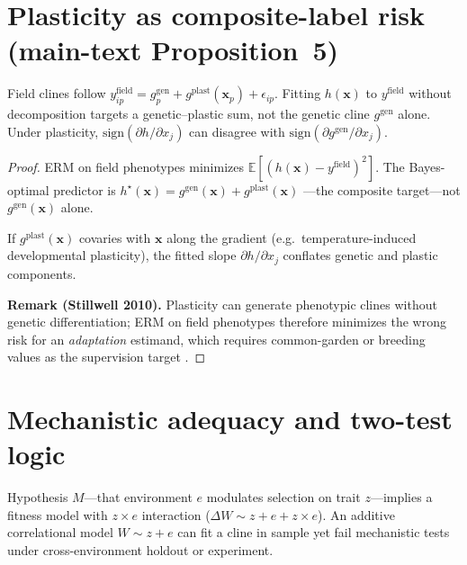\documentclass[11pt]{article}
\begin{document}
\section{Plasticity as composite-label risk (main-text Proposition~5)}
\label{sec:thm6}

\begin{theorem}
\label{thm:esm-plasticity}
Field clines follow
$y^{\mathrm{field}}_{ip}=g^{\mathrm{gen}}_p+g^{\mathrm{plast}}(\mathbf{x}_p)
+\epsilon_{ip}$.  Fitting $h(\mathbf{x})$ to $y^{\mathrm{field}}$ without
decomposition targets a genetic--plastic sum, not the genetic cline
$g^{\mathrm{gen}}$ alone.  Under plasticity,
$\mathrm{sign}(\partial h/\partial x_j)$ can disagree with
$\mathrm{sign}(\partial g^{\mathrm{gen}}/\partial x_j)$.
\end{theorem}

\begin{proof}
ERM on field phenotypes minimizes
$\mathbb{E}[(h(\mathbf{x})-y^{\mathrm{field}})^2]$.  The Bayes-optimal
predictor is
$h^\star(\mathbf{x})=g^{\mathrm{gen}}(\mathbf{x})+g^{\mathrm{plast}}(\mathbf{x})$
---the composite target---not $g^{\mathrm{gen}}(\mathbf{x})$ alone.

If $g^{\mathrm{plast}}(\mathbf{x})$ covaries with $\mathbf{x}$ along the
gradient (e.g.\ temperature-induced developmental plasticity), the fitted
slope $\partial h/\partial x_j$ conflates genetic and plastic components.

\textbf{Remark (Stillwell 2010).}  Plasticity can generate phenotypic clines
without genetic differentiation; ERM on field phenotypes therefore minimizes
the wrong risk for an \emph{adaptation} estimand, which requires
common-garden or breeding values as the supervision target
\citep{via1985,stillwell2010}.
\end{proof}

\section{Mechanistic adequacy and two-test logic}
\label{sec:thm78}

\begin{theorem}
\label{thm:esm-mechanism}
Hypothesis $M$---that environment $e$ modulates selection on trait
$z$---implies a fitness model with $z \times e$ interaction
($\Delta W \sim z + e + z\times e$).  An additive correlational model
$W\sim z+e$ can fit a cline in sample yet fail mechanistic tests under
cross-environment holdout or experiment.
\end{theorem}
\end{document}
